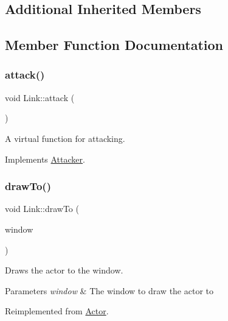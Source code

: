 \subsection*{Additional Inherited Members}


\subsection{Member Function Documentation}
\mbox{\label{classLink_a0d56dc31b6bf76258f50a393e92f46c4}} 
\subsubsection{\texorpdfstring{attack()}{attack()}}
{\footnotesize\ttfamily void Link\+::attack (\begin{DoxyParamCaption}{ }\end{DoxyParamCaption})\hspace{0.3cm}{\ttfamily [virtual]}}



A virtual function for attacking. 



Implements \mbox{\hyperlink{structAttacker_a4ce0aa08a102bd688d9a47322a830173}{Attacker}}.

\mbox{\label{classLink_ac91a924fdf779fa02d477b7f60dbdc1e}} 
\subsubsection{\texorpdfstring{drawTo()}{drawTo()}}
{\footnotesize\ttfamily void Link\+::draw\+To (\begin{DoxyParamCaption}\item[{sf\+::\+Render\+Window \&}]{window }\end{DoxyParamCaption})\hspace{0.3cm}{\ttfamily [virtual]}}



Draws the actor to the window. 


\begin{DoxyParams}{Parameters}
{\em window} & The window to draw the actor to \\
\hline
\end{DoxyParams}


Reimplemented from \mbox{\hyperlink{classActor_af73a6f6670f0507c9e55ec2f61293535}{Actor}}.

